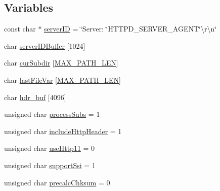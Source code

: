 \subsection*{Variables}
\begin{DoxyCompactItemize}
\item 
const char $\ast$ \hyperlink{openmote-cc2538_2lwip_2src_2apps_2httpd_2makefsdata_2makefsdata_8c_a0e5f2fe823606f3dbf64a81da7eda169}{server\+ID} = \char`\"{}Server\+: \char`\"{}H\+T\+T\+P\+D\+\_\+\+S\+E\+R\+V\+E\+R\+\_\+\+A\+G\+E\+NT\char`\"{}\textbackslash{}r\textbackslash{}n\char`\"{}
\item 
char \hyperlink{openmote-cc2538_2lwip_2src_2apps_2httpd_2makefsdata_2makefsdata_8c_afefc123976dc48b1bf8f8cd9ec82433f}{server\+I\+D\+Buffer} \mbox{[}1024\mbox{]}
\item 
char \hyperlink{openmote-cc2538_2lwip_2src_2apps_2httpd_2makefsdata_2makefsdata_8c_a2be0a7259555ec0e4940ebcdf489ff33}{cur\+Subdir} \mbox{[}\hyperlink{openmote-cc2538_2lwip_2src_2apps_2httpd_2makefsdata_2makefsdata_8c_abdd33f362ae3bbdacb5de76473aa8a2f}{M\+A\+X\+\_\+\+P\+A\+T\+H\+\_\+\+L\+EN}\mbox{]}
\item 
char \hyperlink{openmote-cc2538_2lwip_2src_2apps_2httpd_2makefsdata_2makefsdata_8c_a9aee39ef514de02ab3eb29dd2ecb7e06}{last\+File\+Var} \mbox{[}\hyperlink{openmote-cc2538_2lwip_2src_2apps_2httpd_2makefsdata_2makefsdata_8c_abdd33f362ae3bbdacb5de76473aa8a2f}{M\+A\+X\+\_\+\+P\+A\+T\+H\+\_\+\+L\+EN}\mbox{]}
\item 
char \hyperlink{openmote-cc2538_2lwip_2src_2apps_2httpd_2makefsdata_2makefsdata_8c_aa107ff217f88178d5055bb6cb2b9573e}{hdr\+\_\+buf} \mbox{[}4096\mbox{]}
\item 
unsigned char \hyperlink{openmote-cc2538_2lwip_2src_2apps_2httpd_2makefsdata_2makefsdata_8c_a9bc2ffdcb3d51b83a841ce465fd1b482}{process\+Subs} = 1
\item 
unsigned char \hyperlink{openmote-cc2538_2lwip_2src_2apps_2httpd_2makefsdata_2makefsdata_8c_ad7c4bce2651f43f83ca1e2e9bc8ead95}{include\+Http\+Header} = 1
\item 
unsigned char \hyperlink{openmote-cc2538_2lwip_2src_2apps_2httpd_2makefsdata_2makefsdata_8c_ae3d870e59aa3875d90a6920575c768e5}{use\+Http11} = 0
\item 
unsigned char \hyperlink{openmote-cc2538_2lwip_2src_2apps_2httpd_2makefsdata_2makefsdata_8c_afcd0057cc79bbc5c525a0d08a5014b9a}{support\+Ssi} = 1
\item 
unsigned char \hyperlink{openmote-cc2538_2lwip_2src_2apps_2httpd_2makefsdata_2makefsdata_8c_a67eb0a6dc2f05ddd7be9f88c5e5a01df}{precalc\+Chksum} = 0

\end{DoxyCompactItemize}
